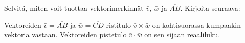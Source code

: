     \begin{harj}
        Selvitä, miten voit tuottaa vektorimerkinnät \(\bar{v}\), \(\bar{w}\) ja \(\overline{AB}\). Kirjoita seuraava:
        \begin{sample}
            Vektoreiden \(\bar{v}=\overline{AB}\) ja \(\bar{w}=\overline{CD}\) ristitulo \(\bar{v}\times\bar{w}\) on kohtisuorassa kumpaakin vektoria vastaan. Vektoreiden pistetulo \(\bar{v}\cdot\bar{w}\) on sen sijaan reaaliluku.
        \end{sample}
    \end{harj}
